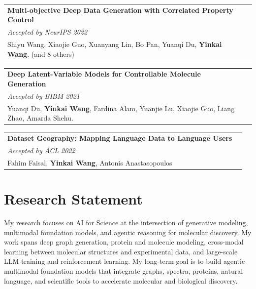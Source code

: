 \documentclass[a4paper,11pt]{article}
\begin{document}
{\begin{tabularx}{\linewidth}{L r}
\textbf{Multi-objective Deep Data Generation with Correlated Property Control} &
\href{https://arxiv.org/pdf/2210.01796}{\raisebox{0.0\height}{\footnotesize [PDF]}}\\
\textit{Accepted by NeurIPS 2022}& \\
{Shiyu Wang, Xiaojie Guo, Xuanyang Lin, Bo Pan, Yuanqi Du, \textbf{Yinkai Wang}. (and 8 others)} & \\
\end{tabularx}

\begin{tabularx}{\linewidth}{L r}
\textbf{Deep Latent-Variable Models for Controllable Molecule Generation} &
\href{https://ieeexplore.ieee.org/stamp/stamp.jsp?tp=\&arnumber=9669692}{\raisebox{0.0\height}{\footnotesize [PDF]}}\\
\textit{Accepted by BIBM 2021}& \\
{Yuanqi Du, \textbf{Yinkai Wang}, Fardina Alam, Yuanjie Lu, Xiaojie Guo, Liang Zhao, Amarda Shehu.} & \\
\end{tabularx}

\begin{tabularx}{\linewidth}{L r}
\textbf{Dataset Geography: Mapping Language Data to Language Users} &
\href{https://aclanthology.org/2022.acl-long.239.pdf}{\raisebox{0.0\height}{\footnotesize [PDF]}}\\
\textit{Accepted by ACL 2022}& \\
{Fahim Faisal, \textbf{Yinkai Wang}, Antonis Anastasopoulos} & \\
\end{tabularx}
}

\section{\textbf{Research Statement}}
\justify
My research focuses on AI for Science at the intersection of generative modeling, multimodal foundation models, and agentic reasoning for molecular discovery. My work spans deep graph generation, protein and molecule modeling, cross-modal learning between molecular structures and experimental data, and large-scale LLM training and reinforcement learning. My long-term goal is to build agentic multimodal foundation models that integrate graphs, spectra, proteins, natural language, and scientific tools to accelerate molecular and biological discovery.
\end{document}
